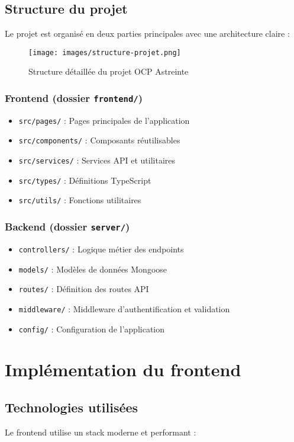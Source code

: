 \subsection{Structure du projet}
Le projet est organisé en deux parties principales avec une architecture claire :

\begin{figure}[h]
\centering
\texttt{[image: images/structure-projet.png]}
\caption{Structure détaillée du projet OCP Astreinte}
\label{fig:structure-projet}
\end{figure}

\subsubsection{Frontend (dossier \texttt{frontend/})}
\begin{itemize}
    \item \texttt{src/pages/} : Pages principales de l'application
    \item \texttt{src/components/} : Composants réutilisables
    \item \texttt{src/services/} : Services API et utilitaires
    \item \texttt{src/types/} : Définitions TypeScript
    \item \texttt{src/utils/} : Fonctions utilitaires
\end{itemize}

\subsubsection{Backend (dossier \texttt{server/})}
\begin{itemize}
    \item \texttt{controllers/} : Logique métier des endpoints
    \item \texttt{models/} : Modèles de données Mongoose
    \item \texttt{routes/} : Définition des routes API
    \item \texttt{middleware/} : Middleware d'authentification et validation
    \item \texttt{config/} : Configuration de l'application
\end{itemize}

\section{Implémentation du frontend}
\subsection{Technologies utilisées}
Le frontend utilise un stack moderne et performant :

